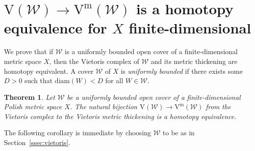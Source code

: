 \documentclass[11pt, reqno, english]{amsart}
\theoremstyle{plain}
\newtheorem{theorem}[lemma]{Theorem}
\theoremstyle{definition}
\theoremstyle{myremark}
\newcommand{\cW}{\mathcal{W}}
\newcommand{\diam}{\mathrm{diam}}
\newcommand{\vr}[2]{\mathrm{VR}(#1;#2)}
\newcommand{\viet}[1]{\mathrm{V}(#1)}
\newcommand{\vietm}[1]{\mathrm{V}^\mathrm{m}(#1)}
\newcommand{\vrm}[2]{\mathrm{VR}^\mathrm{m}(#1;#2)}
\begin{document}
\section{$\viet{\cW}\to\vietm{\cW}$ is a homotopy equivalence for $X$ finite-dimensional}
\label{sec:homotopy-equiv}






We prove that if $\cW$ is a uniformly bounded open cover of a finite-dimensional metric space $X$, then the Vietoris complex of $\cW$ and its metric thickening are homotopy equivalent.
A cover $\cW$ of $X$ is \emph{uniformly bounded} if there exists some $D>0$ such that $\diam(W) < D$ for all $W \in \cW$.

\begin{theorem}
\label{thm:main}
Let $\cW$ be a uniformly bounded open cover of a finite-dimensional Polish metric space $X$.
The natural bijection $\viet{\cW}\to\vietm{\cW}$ from the  Vietoris complex to the Vietoris metric thickening is a homotopy equivalence.
\end{theorem}

The following corollary is immediate by choosing $\cW$ to be as in Section~\ref{ssec:vietoris}.
\end{document}
